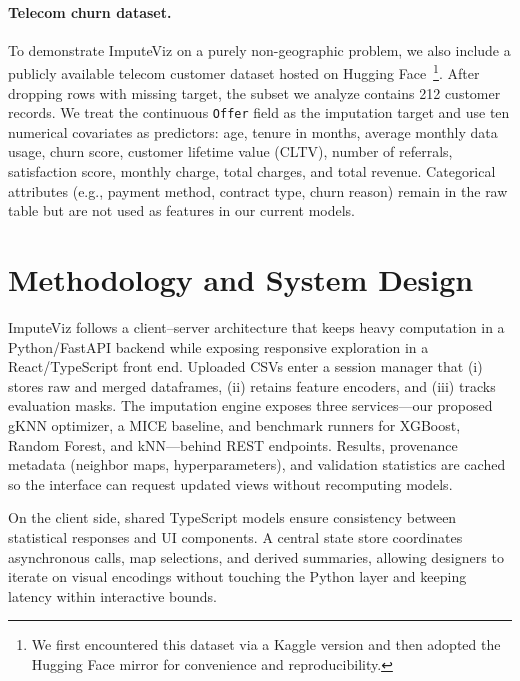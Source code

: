 \documentclass[review]{vgtc}
\newcommand{\gknn}{gKNN\xspace}
\newcommand{\mice}{MICE\xspace}
\newcommand{\tool}{ImputeViz\xspace}
\begin{document}
\paragraph*{Telecom churn dataset.}
To demonstrate \tool on a purely non-geographic problem, we also include a publicly available telecom customer dataset hosted on Hugging Face~\cite{telcoHF}\footnote{We first encountered this dataset via a Kaggle version and then adopted the Hugging Face mirror for convenience and reproducibility.}. After dropping rows with missing target, the subset we analyze contains 212 customer records. We treat the continuous \texttt{Offer} field as the imputation target and use ten numerical covariates as predictors: age, tenure in months, average monthly data usage, churn score, customer lifetime value (CLTV), number of referrals, satisfaction score, monthly charge, total charges, and total revenue. Categorical attributes (e.g., payment method, contract type, churn reason) remain in the raw table but are not used as features in our current models.

\section{Methodology and System Design}
\label{sec:method}

\tool follows a client--server architecture that keeps heavy computation in a Python/FastAPI backend while exposing responsive exploration in a React/TypeScript front end. Uploaded CSVs enter a session manager that (i) stores raw and merged dataframes, (ii) retains feature encoders, and (iii) tracks evaluation masks. The imputation engine exposes three services---our proposed \gknn{} optimizer, a \mice{} baseline, and benchmark runners for XGBoost, Random Forest, and kNN---behind REST endpoints. Results, provenance metadata (neighbor maps, hyperparameters), and validation statistics are cached so the interface can request updated views without recomputing models.

On the client side, shared TypeScript models ensure consistency between statistical responses and UI components. A central state store coordinates asynchronous calls, map selections, and derived summaries, allowing designers to iterate on visual encodings without touching the Python layer and keeping latency within interactive bounds.
\end{document}
